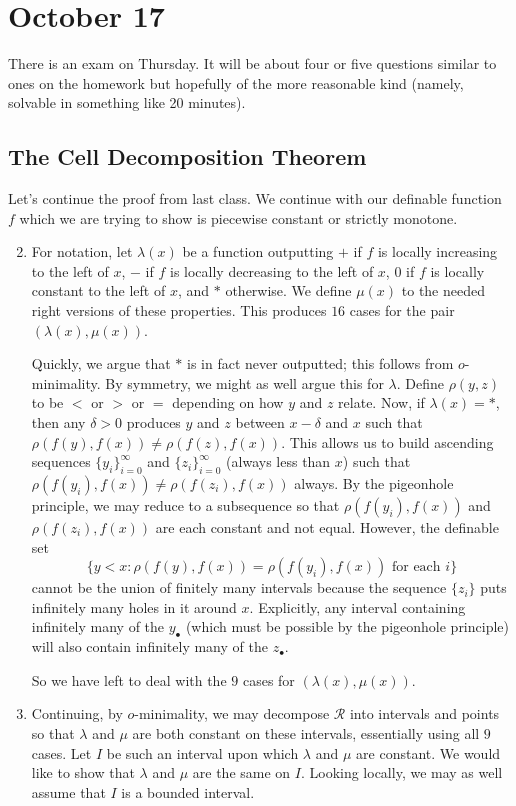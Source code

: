 \documentclass[../notes.tex]{subfiles}
\begin{document}
\section{October 17}

There is an exam on Thursday. It will be about four or five questions similar to ones on the homework but hopefully of the more reasonable kind (namely, solvable in something like 20 minutes).

\subsection{The Cell Decomposition Theorem}
Let's continue the proof from last class. We continue with our definable function $f$ which we are trying to show is piecewise constant or strictly monotone.
\begin{enumerate}
	\setcounter{enumi}{1}
	\item For notation, let $\lambda(x)$ be a function outputting $+$ if $f$ is locally increasing to the left of $x$, $-$ if  $f$ is locally decreasing to the left of $x$, $0$ if $f$ is locally constant to the left of $x$, and $*$ otherwise. We define $\mu(x)$ to the needed right versions of these properties. This produces $16$ cases for the pair $(\lambda(x),\mu(x))$.

	Quickly, we argue that $*$ is in fact never outputted; this follows from $o$-minimality. By symmetry, we might as well argue this for $\lambda$. Define $\rho(y,z)$ to be $<$ or $>$ or $=$ depending on how $y$ and $z$ relate. Now, if $\lambda(x)=*$, then any $\delta>0$ produces $y$ and $z$ between $x-\delta$ and $x$ such that $\rho(f(y),f(x))\ne\rho(f(z),f(x))$. This allows us to build ascending sequences $\{y_i\}_{i=0}^\infty$ and $\{z_i\}_{i=0}^\infty$ (always less than $x$) such that $\rho(f(y_i),f(x))\ne\rho(f(z_i),f(x))$ always. By the pigeonhole principle, we may reduce to a subsequence so that $\rho(f(y_i),f(x))$ and $\rho(f(z_i),f(x))$ are each constant and not equal. However, the definable set
	\[\{y<x:\rho(f(y),f(x))=\rho(f(y_i),f(x))\text{ for each }i\}\]
	cannot be the union of finitely many intervals because the sequence $\{z_i\}$ puts infinitely many holes in it around $x$. Explicitly, any interval containing infinitely many of the $y_\bullet$ (which must be possible by the pigeonhole principle) will also contain infinitely many of the $z_\bullet$.

	So we have left to deal with the $9$ cases for $(\lambda(x),\mu(x))$.

	\item Continuing, by $o$-minimality, we may decompose $\mathcal R$ into intervals and points so that $\lambda$ and $\mu$ are both constant on these intervals, essentially using all $9$ cases. Let $I$ be such an interval upon which $\lambda$ and $\mu$ are constant. We would like to show that $\lambda$ and $\mu$ are the same on $I$. Looking locally, we may as well assume that $I$ is a bounded interval.
	

\end{enumerate}
\end{document}
